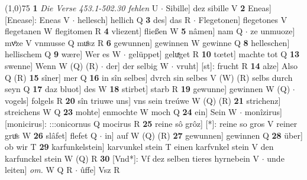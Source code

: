 \documentclass[8pt,a4paper,notitlepage]{article}
\begin{document}
\begin{table}[ht]
\begin{minipage}[t]{0.5\linewidth}
\line(1,0){75} \newline
\textbf{1} \textit{Die Verse 453.1-502.30 fehlen} U   $\cdot$ Sibille] dez sibille V \textbf{2} Eneas] [Enease]: Eneas V  $\cdot$ hellesch] hellich Q \textbf{3} des] das R  $\cdot$ Flegetonen] flegetones V flegetanen W flegitomen R \textbf{4} vliezent] fließen W \textbf{5} nâmen] nam Q  $\cdot$ ze unmuoze] mvͦze V vnmusse Q muͦsz R \textbf{6} gewunnen] gewinnen W gewinne Q \textbf{8} helleschen] hellischem Q \textbf{9} wære] Wer es W  $\cdot$ gelüppet] geluͯget R \textbf{10} tœtet] machte tot Q \textbf{13} swenne] Wenn W (Q) (R)  $\cdot$ der] der selbig W  $\cdot$ vruht] [st]: frucht R \textbf{14} alze] Also Q (R) \textbf{15} sîner] mer Q \textbf{16} in sîn selbes] dvrch sin selbes V (W) (R) selbs durch seyn Q \textbf{17} daz bluot] des W \textbf{18} stirbet] starb R \textbf{19} gewunne] gewinnen W (Q)  $\cdot$ vogels] folgels R \textbf{20} sîn triuwe uns] vns sein treúwe W (Q) (R) \textbf{21} strichenz] streichens W Q \textbf{23} mohte] enmochte W moch Q \textbf{24} ein] Sein W  $\cdot$ monîzirus] [monicirus]: :::onicornus Q mocirus R \textbf{25} reine sô grôz] [*]: reine so gros V reiner gruͦs W \textbf{26} slâfet] flefet Q  $\cdot$ in] auf W (Q) (R) \textbf{27} gewunnen] gewinnen Q \textbf{28} über] ob wir T \textbf{29} karfunkelstein] karvunkel stein T einen karfvnkel stein V den karfunckel stein W (Q) R \textbf{30} [Vnd*]: Vf dez selben tieres hyrnebein V  $\cdot$ unde leiten] \textit{om.} W Q R  $\cdot$ ûffe] Vsz R \newline
\end{minipage}
\end{table}
\end{document}
